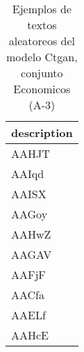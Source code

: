 \begin{table}[H]
\centering
\fontsize{8}{14}\selectfont
\caption{Ejemplos de textos aleatoreos del modelo Ctgan, conjunto Economicos (A-3)}
\label{table-sample10-economicos-a-3-ctgan-text}
\begin{tabular}{|m{50em}|}
\hline
\rowcolor[gray]{0.8}
description \\
\hline AAHJT \\
\hline AAIqd \\
\hline AAISX \\
\hline AAGoy \\
\hline AAHwZ \\
\hline AAGAV \\
\hline AAFjF \\
\hline AACfa \\
\hline AAELf \\
\hline AAHcE \\
\hline
\end{tabular}
\end{table}
